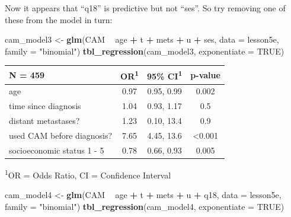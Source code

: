 \documentclass[]{book}
\newenvironment{Shaded}{\begin{snugshade}}{\end{snugshade}}
\newcommand{\DataTypeTok}[1]{\textcolor[rgb]{0.13,0.29,0.53}{#1}}
\newcommand{\KeywordTok}[1]{\textcolor[rgb]{0.13,0.29,0.53}{\textbf{#1}}}
\newcommand{\NormalTok}[1]{#1}
\newcommand{\OperatorTok}[1]{\textcolor[rgb]{0.81,0.36,0.00}{\textbf{#1}}}
\newcommand{\OtherTok}[1]{\textcolor[rgb]{0.56,0.35,0.01}{#1}}
\newcommand{\StringTok}[1]{\textcolor[rgb]{0.31,0.60,0.02}{#1}}
\begin{document}
Now it appears that ``q18'' is predictive but not ``ses''. So try
removing one of these from the model in turn:

\begin{Shaded}
\begin{Highlighting}[]
\NormalTok{cam_model3 <-}\StringTok{ }\KeywordTok{glm}\NormalTok{(CAM }\OperatorTok{~}\StringTok{ }\NormalTok{age }\OperatorTok{+}\StringTok{ }\NormalTok{t }\OperatorTok{+}\StringTok{ }\NormalTok{mets }\OperatorTok{+}\StringTok{ }\NormalTok{u }\OperatorTok{+}\StringTok{ }\NormalTok{ses,}
                  \DataTypeTok{data =}\NormalTok{ lesson5e,}
                  \DataTypeTok{family =} \StringTok{"binomial"}\NormalTok{)}
\KeywordTok{tbl_regression}\NormalTok{(cam_model3, }\DataTypeTok{exponentiate =} \OtherTok{TRUE}\NormalTok{)}
\end{Highlighting}
\end{Shaded}

\captionsetup[table]{labelformat=empty,skip=1pt}
\begin{longtable}{lccc}
\toprule
\textbf{N = 459} & \textbf{OR}\textsuperscript{1} & \textbf{95\% CI}\textsuperscript{1} & \textbf{p-value} \\ 
\midrule
age & 0.97 & 0.95, 0.99 & 0.002 \\ 
time since diagnosis & 1.04 & 0.93, 1.17 & 0.5 \\ 
distant metastases? & 1.23 & 0.10, 13.4 & 0.9 \\ 
used CAM before diagnosis? & 7.65 & 4.45, 13.6 & <0.001 \\ 
socioeconomic status 1 - 5 & 0.78 & 0.66, 0.93 & 0.005 \\ 
\bottomrule
\end{longtable}
\vspace{-5mm}
\begin{minipage}{\linewidth}
\textsuperscript{1}OR = Odds Ratio, CI = Confidence Interval \\ 
\end{minipage}

\begin{Shaded}
\begin{Highlighting}[]
\NormalTok{cam_model4 <-}\StringTok{ }\KeywordTok{glm}\NormalTok{(CAM }\OperatorTok{~}\StringTok{ }\NormalTok{age }\OperatorTok{+}\StringTok{ }\NormalTok{t }\OperatorTok{+}\StringTok{ }\NormalTok{mets }\OperatorTok{+}\StringTok{ }\NormalTok{u }\OperatorTok{+}\StringTok{ }\NormalTok{q18,}
                  \DataTypeTok{data =}\NormalTok{ lesson5e,}
                  \DataTypeTok{family =} \StringTok{"binomial"}\NormalTok{)}
\KeywordTok{tbl_regression}\NormalTok{(cam_model4, }\DataTypeTok{exponentiate =} \OtherTok{TRUE}\NormalTok{)}
\end{Highlighting}
\end{Shaded}
\end{document}
